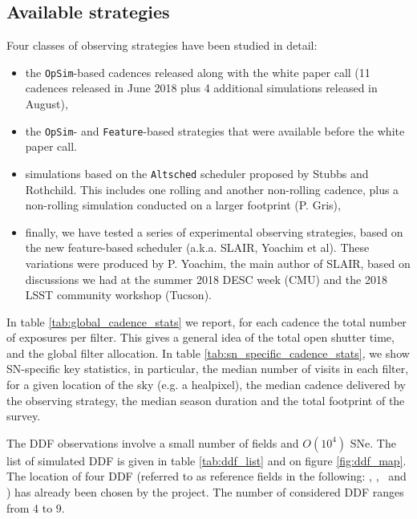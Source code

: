 
\subsection{Available strategies}

Four classes of observing strategies have been studied in detail:
\begin{itemize}

\item the {\tt OpSim}-based cadences released along with the white
  paper call (11 cadences released in June 2018 plus 4 additional
  simulations released in August), 
  
\item the {\tt OpSim}- and {\tt Feature}-based strategies that were
  available before the white paper call. 

\item simulations based on the {\tt Altsched} scheduler proposed by
  Stubbs and Rothchild.  This includes one rolling and another
  non-rolling cadence, plus a non-rolling simulation conducted on a
  larger footprint (P. Gris),

\item finally, we have tested a series of experimental observing
  strategies, based on the new feature-based scheduler (a.k.a.  SLAIR,
  Yoachim et al). These variations were produced by P. Yoachim, the
  main author of SLAIR, based on discussions we had at the summer 2018
  DESC week (CMU) and the 2018 LSST community workshop (Tucson).
\end{itemize}

In table \ref{tab:global_cadence_stats} we report, for each cadence
the total number of exposures per filter. This gives a general idea of
the total open shutter time, and the global filter allocation.  In
table \ref{tab:sn_specific_cadence_stats}, we show SN-specific key
statistics, in particular, the median number of visits in each filter,
for a given location of the sky (e.g. a healpixel), the median cadence
delivered by the observing strategy, the median season duration and
the total footprint of the survey.

The DDF  observations involve a  small number of fields  and $O(10^4)$
SNe. The list of simulated DDF is given in table
\ref{tab:ddf_list} and on figure \ref{fig:ddf_map}. The location of four DDF (referred to as reference fields in the following: \cosmos, \xmmlss, \cdfs~and \elais) has already been chosen by the project. The number of considered DDF ranges from 4 to 9.


